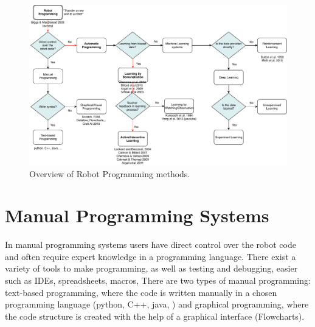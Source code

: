 \begin{figure}
	\centering
	\includegraphics[width=\linewidth]{figures/RobotProgrammingOverview}
	\caption{Overview of Robot Programming methods.}
	\label{fig:RobotProgrammingOverview}
\end{figure}

\newpage

\section{Manual Programming Systems}\label{subsec:Manual Programming Systems}
In manual programming systems users have direct control over the robot code
and often require expert knowledge in a programming language. %
There exist a variety of tools to make programming, as well as testing and debugging, easier such as IDEs, spreadsheets, macros, \etc
There are two types of manual programming: text-based programming, where the code is written manually in a chosen programming language (python, C++, java, \etc) and graphical programming, where the code structure is created with the help of a graphical interface (\eg Flowcharts). 

